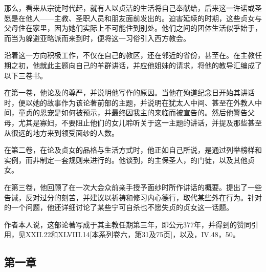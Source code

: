 那么，看来从宗徒时代起，就有人以贞洁的生活将自己奉献给，后来这一许诺或圣愿是在他人——主教、圣职人员和朋友面前发出的。迫害延续的时期，这些贞女与父母住在家里，因为她们实际上不可能住到别处。他们之间的团体生活似乎始于，而当为躲避亚略派而来到时，便将这一习俗引入西方教会。\par

沿着这一方向积极工作，不仅在自己的教区，还在邻近的省份，甚至在。在主教任期之初，他就此主题向自己的羊群讲话，并应他姐妹的请求，将他的教导汇编成了以下三卷书。\par

在第一卷，他论及的尊严，并说明他写作的原因。当他在殉道纪念日开始其讲话时，便以她的故事作为该论著前部的主题，并说明在犹太人中间、甚至在外教人中间，童贞的恩宠是如何被预示，并最终因我主的来临而被宣告的。然后他警告父母，尤其是寡妇，不要阻止他们的女儿聆听关于这一主题的讲话，并提及那些甚至从很远的地方来到领受面纱的人数。\par

在第二卷，在论及贞女的品格与生活方式时，他正如自己所说，是通过列举榜样和实例，而非制定一套规则来进行的。他谈到，的主保圣人，的门徒，以及其他贞女。\par

在第三卷，他回顾了在一次大会众前亲手授予面纱时所作讲话的概要。提出了一些告诫，反对过分的刻苦，并建议以祈祷和修习内心德行，取代某些外在行为。针对的一个问题，他还详细讨论了某些宁可自杀也不愿失贞的贞女这一话题。\par

作者本人说，这部论著写成于其主教任期第三年，即公元377年，并得到的赞同引用，见XXII.22和XLVIII.14[本系列卷六，第31及75页]，以及，IV.48，50。\par

\par


\subsection{第一章}

\par


